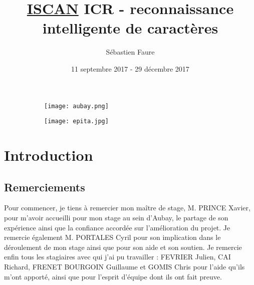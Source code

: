 \documentclass[12pt,a4paper]{article}
\title{\textbf { \huge{\underline{ISCAN}} \bigbreak  \large{ICR - reconnaissance intelligente de caractères}}}
\author{Sébastien Faure}
\date{11 septembre 2017 - 29 décembre 2017}
\begin{document}
\pagestyle{fancy}

\maketitle
\begin{figure}[!h]
    \centering
    \begin{subfigure}{.49\textwidth}
      \centering
    \texttt{[image: aubay.png]}
    \end{subfigure}
    \begin{subfigure}{.49\textwidth}
      \centering
      \texttt{[image: epita.jpg]}
    \end{subfigure}
\end{figure}

\newpage
\thispagestyle{empty}
\tableofcontents

\newpage
{}
\section{Introduction}
\subsection{Remerciements}
Pour commencer, je tiens à remercier mon maître de stage, M. PRINCE Xavier, pour m’avoir accueilli pour mon stage au sein d'Aubay, le partage de son expérience ainsi que la confiance accordée sur l'amélioration du projet.\bigbreak
Je remercie également M. PORTALES Cyril pour son implication dans le déroulement de mon stage ainsi que pour son aide et son soutien.\bigbreak
Je remercie enfin tous les stagiaires avec qui j’ai pu travailler : FEVRIER Julien, CAI Richard, FRENET BOURGOIN Guillaume et GOMIS Chris pour l'aide qu'ils m'ont apporté, ainsi que pour l’esprit d’équipe dont ils ont fait preuve.
\end{document}
